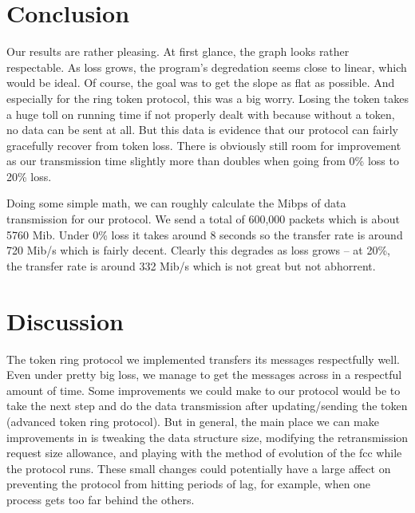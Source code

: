 \documentclass[12pt,journal,compsoc]{IEEEtran}
\begin{document}
\section{Conclusion}
Our results are rather pleasing. At first glance, the graph looks rather respectable. As loss grows, the program's degredation seems close to linear, which would be ideal. Of course, the goal was to get the slope as flat as possible. And especially for the ring token protocol, this was a big worry. Losing the token takes a huge toll on running time if not properly dealt with because without a token, no data can be sent at all. But this data is evidence that our protocol can fairly gracefully recover from token loss. There is obviously still room for improvement as our transmission time slightly more than doubles when going from 0\% loss to 20\% loss.

Doing some simple math, we can roughly calculate the Mibps of data transmission for our protocol. We send a total of 600,000 packets which is about 5760 Mib. Under 0\% loss it takes around 8 seconds so the transfer rate is around 720 Mib/s which is fairly decent. Clearly this degrades as loss grows -- at 20\%, the transfer rate is around 332 Mib/s which is not great but not abhorrent.

\section{Discussion}
The token ring protocol we implemented transfers its messages respectfully well. Even under pretty big loss, we manage to get the messages across in a respectful amount of time. Some improvements we could make to our protocol would be to take the next step and do the data transmission after updating/sending the token (advanced token ring protocol). But in general, the main place we can make improvements in is tweaking the data structure size, modifying the retransmission request size allowance, and playing with the method of evolution of the fcc while the protocol runs. These small changes could potentially have a large affect on preventing the protocol from hitting periods of lag, for example, when one process gets too far behind the others.
\end{document}
